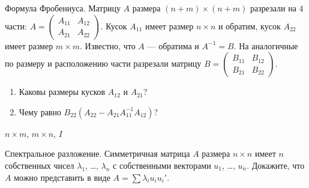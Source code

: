 \begin{problem}
Формула Фробениуса. Матрицу $A$ размера $(n+m)\times (n+m)$ разрезали на 4 части: $A=\begin{pmatrix}
A_{11} & A_{12} \\
A_{21} & A_{22}
\end{pmatrix}$. Кусок $A_{11}$ имеет размер $n\times n$ и обратим, кусок $A_{22}$ имеет размер $m\times m$. Известно, что $A$ — обратима и $A^{-1}=B$. На аналогичные по размеру и расположению части разрезали матрицу $B=\begin{pmatrix}
B_{11} & B_{12} \\
B_{21} & B_{22}
\end{pmatrix}$.
\begin{enumerate}
\item Каковы размеры кусков $A_{12}$ и $A_{21}$?
\item Чему равно $B_{22}(A_{22}-A_{21}A_{11}^{-1}A_{12})$?
\end{enumerate}


\begin{sol}
$n\times m$, $m\times n$, $I$
\end{sol}
\end{problem}




\begin{problem}
Спектральное разложение. Симметричная матрица $A$ размера $n\times n$ имеет $n$ собственных чисел $\lambda_1$, \ldots, $\lambda_n$ с собственными векторами $u_1$, \ldots, $u_n$. Докажите, что $A$ можно представить в виде $A=\sum \lambda_i u_i u_i'$.


\begin{sol}
\end{sol}
\end{problem}



